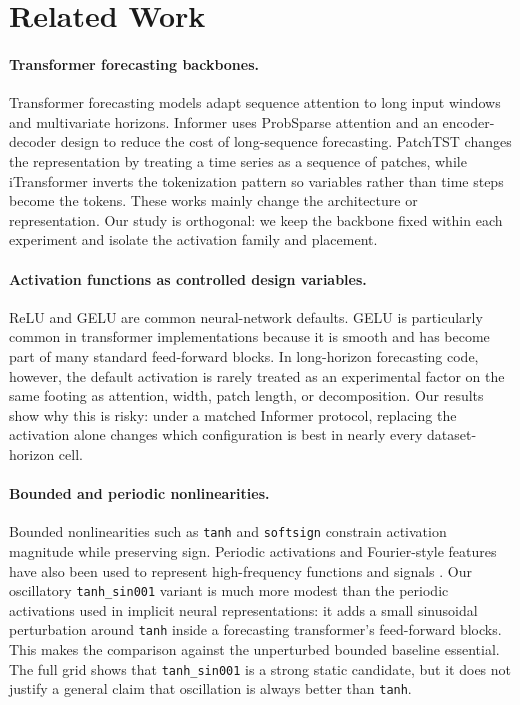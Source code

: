 \section{Related Work}

\paragraph{Transformer forecasting backbones.}
Transformer forecasting models adapt sequence attention to long input windows and multivariate horizons. Informer \citep{zhou2021informer} uses ProbSparse attention and an encoder-decoder design to reduce the cost of long-sequence forecasting. PatchTST \citep{nie2023patchtst} changes the representation by treating a time series as a sequence of patches, while iTransformer \citep{liu2023itransformer} inverts the tokenization pattern so variables rather than time steps become the tokens. These works mainly change the architecture or representation. Our study is orthogonal: we keep the backbone fixed within each experiment and isolate the activation family and placement.

\paragraph{Activation functions as controlled design variables.}
ReLU \citep{nair2010relu} and GELU \citep{hendrycks2016gelu} are common neural-network defaults. GELU is particularly common in transformer implementations because it is smooth and has become part of many standard feed-forward blocks. In long-horizon forecasting code, however, the default activation is rarely treated as an experimental factor on the same footing as attention, width, patch length, or decomposition. Our results show why this is risky: under a matched Informer protocol, replacing the activation alone changes which configuration is best in nearly every dataset-horizon cell.

\paragraph{Bounded and periodic nonlinearities.}
Bounded nonlinearities such as \texttt{tanh} and \texttt{softsign} constrain activation magnitude while preserving sign. Periodic activations and Fourier-style features have also been used to represent high-frequency functions and signals \citep{sitzmann2020siren,tancik2020fourier}. Our oscillatory \texttt{tanh\_sin001} variant is much more modest than the periodic activations used in implicit neural representations: it adds a small sinusoidal perturbation around \texttt{tanh} inside a forecasting transformer's feed-forward blocks. This makes the comparison against the unperturbed bounded baseline essential. The full grid shows that \texttt{tanh\_sin001} is a strong static candidate, but it does not justify a general claim that oscillation is always better than \texttt{tanh}.

